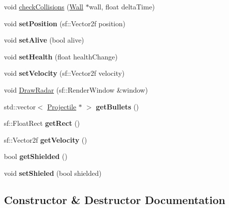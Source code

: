\begin{DoxyCompactItemize}
\item 
void \mbox{\hyperlink{class_player_ae2d4369f7701288665103149e148a669}{check\+Collisions}} (\mbox{\hyperlink{class_wall}{Wall}} $\ast$wall, float delta\+Time)
\item 
\mbox{\label{class_player_a876818716e936257241f6febfa6c3cc6}} 
void {\bfseries set\+Position} (sf\+::\+Vector2f position)
\item 
\mbox{\label{class_player_ae5e73c4b965ffa4d69eeedc2e31f8c5d}} 
void {\bfseries set\+Alive} (bool alive)
\item 
\mbox{\label{class_player_a2b20fb72e20c7609d903891cbf0ac3b3}} 
void {\bfseries set\+Health} (float health\+Change)
\item 
\mbox{\label{class_player_a11dc9fd8534645977d088ca467629853}} 
void {\bfseries set\+Velocity} (sf\+::\+Vector2f velocity)
\item 
void \mbox{\hyperlink{class_player_ac91387d54e20b6e9286c2e2ecba5afc7}{Draw\+Radar}} (sf\+::\+Render\+Window \&window)
\item 
\mbox{\label{class_player_a40c5ee51c931bf8c6d3f830e512d0b6a}} 
std\+::vector$<$ \mbox{\hyperlink{class_projectile}{Projectile}} $\ast$ $>$ {\bfseries get\+Bullets} ()
\item 
\mbox{\label{class_player_a6cfd0af7aaf2b13d65aa42f78c6085ec}} 
sf\+::\+Float\+Rect {\bfseries get\+Rect} ()
\item 
\mbox{\label{class_player_a363489e11401d5a1549e315c8c8aa220}} 
sf\+::\+Vector2f {\bfseries get\+Velocity} ()
\item 
\mbox{\label{class_player_adfa3ea6cdd232a1021cbf017010d8cde}} 
bool {\bfseries get\+Shielded} ()
\item 
\mbox{\label{class_player_a0bac13d8b70eaa143d3b95d17fbd1f91}} 
void {\bfseries set\+Shieled} (bool shielded)
\end{DoxyCompactItemize}


\subsection{Constructor \& Destructor Documentation}
\mbox{\label{class_player_aa6ba3005051279dc1d45ac615f197ef5}} 
